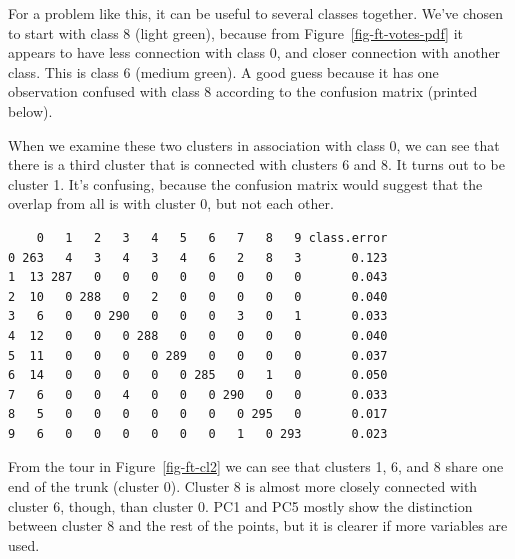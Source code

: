 \documentclass[
  letterpaper,
]{krantz}
\newenvironment{Shaded}{\begin{snugshade}}{\end{snugshade}}
\newcommand{\NormalTok}[1]{\textcolor[rgb]{0.00,0.23,0.31}{#1}}
\newcommand{\SpecialCharTok}[1]{\textcolor[rgb]{0.37,0.37,0.37}{#1}}
\begin{document}
For a problem like this, it can be useful to several classes together.
We've chosen to start with class 8 (light green), because from
Figure~\ref{fig-ft-votes-pdf} it appears to have less connection with
class 0, and closer connection with another class. This is class 6
(medium green). A good guess because it has one observation confused
with class 8 according to the confusion matrix (printed below).

When we examine these two clusters in association with class 0, we can
see that there is a third cluster that is connected with clusters 6 and
8. It turns out to be cluster 1. It's confusing, because the confusion
matrix would suggest that the overlap from all is with cluster 0, but
not each other.

\begin{Shaded}
\end{Shaded}

\begin{verbatim}
    0   1   2   3   4   5   6   7   8   9 class.error
0 263   4   3   4   3   4   6   2   8   3       0.123
1  13 287   0   0   0   0   0   0   0   0       0.043
2  10   0 288   0   2   0   0   0   0   0       0.040
3   6   0   0 290   0   0   0   3   0   1       0.033
4  12   0   0   0 288   0   0   0   0   0       0.040
5  11   0   0   0   0 289   0   0   0   0       0.037
6  14   0   0   0   0   0 285   0   1   0       0.050
7   6   0   0   4   0   0   0 290   0   0       0.033
8   5   0   0   0   0   0   0   0 295   0       0.017
9   6   0   0   0   0   0   0   1   0 293       0.023
\end{verbatim}

From the tour in Figure~\ref{fig-ft-cl2} we can see that clusters 1, 6,
and 8 share one end of the trunk (cluster 0). Cluster 8 is almost more
closely connected with cluster 6, though, than cluster 0. PC1 and PC5
mostly show the distinction between cluster 8 and the rest of the
points, but it is clearer if more variables are used.
\end{document}

